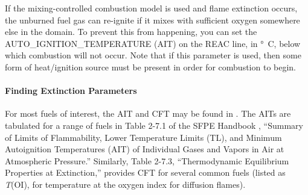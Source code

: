 \documentclass[11pt]{book}
\begin{document}
If the mixing-controlled combustion model is used and flame extinction occurs, the unburned fuel gas can re-ignite if it mixes with sufficient oxygen somewhere else in the domain. To prevent this from happening, you can set the {\ct AUTO\_IGNITION\_TEMPERATURE} (AIT) on the {\ct REAC} line, in \si{\degree C}, below which combustion will not occur. Note that if this parameter is used, then some form of heat/ignition source must be present in order for combustion to begin.

\paragraph{Finding Extinction Parameters}

For most fuels of interest, the AIT and CFT may be found in \cite{SFPE:Beyler}.  The AITs are tabulated for a range of fuels in Table 2-7.1 of the SFPE Handbook \cite{SFPE}, ``Summary of Limits of Flammability, Lower Temperature Limits (TL), and Minimum Autoignition Temperatures (AIT) of Individual Gases and Vapors in Air at Atmospheric Pressure.''  Similarly, Table 2-7.3, ``Thermodynamic Equilibrium Properties at Extinction,'' provides CFT for several common fuels (listed as {\it T}(OI), for temperature at the oxygen index for diffusion flames).

\end{document}
